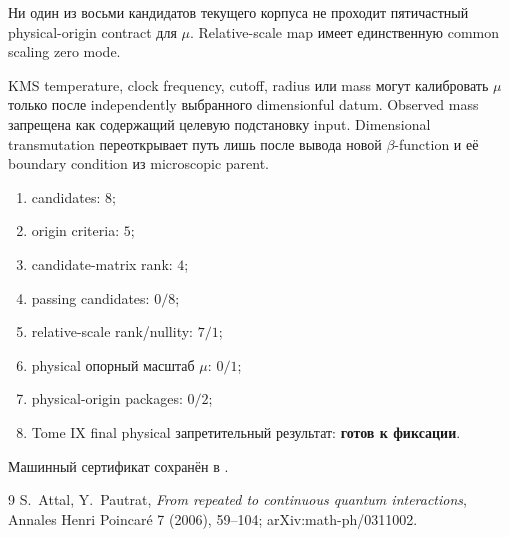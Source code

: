 \begin{theorem}
Ни один из восьми кандидатов текущего корпуса не проходит пятичастный
physical-origin contract для $\mu$. Relative-scale map имеет единственную
common scaling zero mode.
\end{theorem}

\begin{nogocriterion}
KMS temperature, clock frequency, cutoff, radius или mass могут
калибровать $\mu$ только после independently выбранного dimensionful datum.
Observed mass запрещена как содержащий целевую подстановку input. Dimensional transmutation
переоткрывает путь лишь после вывода новой $\beta$-function и её boundary
condition из microscopic parent.
\end{nogocriterion}

\begin{protocol}\begin{enumerate}
\item candidates: \textbf{$8$};
\item origin criteria: \textbf{$5$};
\item candidate-matrix rank: \textbf{$4$};
\item passing candidates: \textbf{$0/8$};
\item relative-scale rank/nullity: \textbf{$7/1$};
\item physical опорный масштаб $\mu$: \textbf{$0/1$};
\item physical-origin packages: \textbf{$0/2$};
\item Tome IX final physical запретительный результат: \textbf{готов к фиксации}.
\end{enumerate}\end{protocol}

Машинный сертификат сохранён в
.

\begin{thebibliography}{9}
S.~Attal, Y.~Pautrat,
\emph{From repeated to continuous quantum interactions},
Annales Henri Poincar\'e 7 (2006), 59--104; arXiv:math-ph/0311002.
\end{thebibliography}